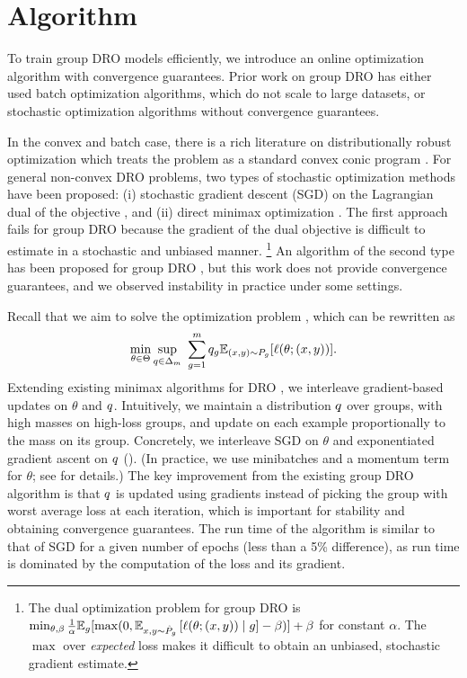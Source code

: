 \section{Algorithm}\label{sec:alg}
To train group DRO models efficiently, we introduce an online optimization algorithm with convergence guarantees.
Prior work on group DRO has either used batch optimization algorithms, which do not scale to large datasets, or stochastic optimization algorithms without convergence guarantees.

In the convex and batch case, there is a rich literature on distributionally robust optimization which treats the problem as a standard convex conic program \citep{bental2013robust, duchi2016, bertsimas2018data, lam2015quantifying}.
For general non-convex DRO problems, two types of stochastic optimization methods have been proposed:
(i) stochastic gradient descent (SGD) on the Lagrangian dual of the objective \citep{duchi2018learning,hashimoto2018repeated}, and
(ii) direct minimax optimization \citep{namkoong2016stochastic}.
The first approach fails for group DRO because the gradient of the dual objective is difficult to estimate in a stochastic and unbiased manner.%
\footnote{
The dual optimization problem for group DRO is $\min_{\theta,\beta}\frac{1}{\alpha}\mathbb{E}_g[\max(0,\mathbb{E}_{x,y\sim{\hat{P}}_g}\left[\ell(\theta; (x,y))\mid g\right]-\beta)] + \beta$ for constant $\alpha$. The $\max$ over \emph{expected} loss makes it difficult to obtain an unbiased, stochastic gradient estimate.
}
An algorithm of the second type has been proposed for group DRO \citep{oren2019drolm},
but this work does not provide convergence guarantees, and we observed instability in practice under some settings.

Recall that we aim to solve the optimization problem , which can be rewritten as
\begin{align}
  \min_{\theta \in \Theta} \sup_{q \in \Delta_m} \ \sum_{g=1}^m q_g \mathbb{E}_{(x, y) \sim P_g}[\ell(\theta; (x, y))].
\end{align}
Extending existing minimax algorithms for DRO \citep{namkoong2016stochastic,oren2019drolm},
we interleave gradient-based updates on $\theta$ and $q$.
Intuitively, we maintain a distribution $q$ over groups, with high masses on high-loss groups,
and update on each example proportionally to the mass on its group.
Concretely, we interleave SGD on $\theta$ and exponentiated gradient ascent on $q$
(). (In practice, we use minibatches and a momentum term for $\theta$; see  for details.)
The key improvement from the existing group DRO algorithm \citep{oren2019drolm} is that $q$ is updated using gradients instead of picking the group with worst average loss at each iteration,
which is important for stability and obtaining convergence guarantees.
The run time of the algorithm is similar to that of SGD for a given number of epochs (less than a 5\% difference), as run time is dominated by the computation of the loss and its gradient.

